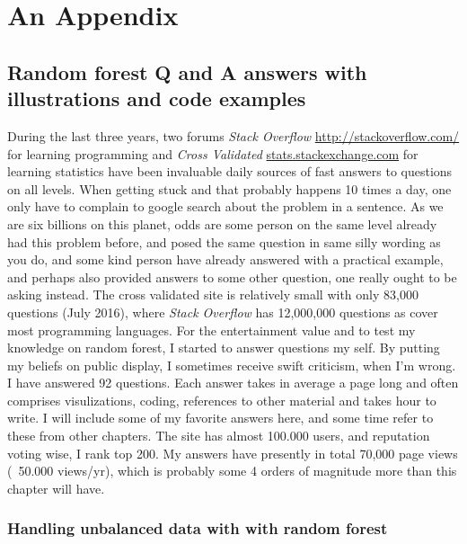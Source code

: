 \chapter{An Appendix}


\section{Random forest Q and A answers with illustrations and code examples}

During the last three years, two forums \textit{Stack Overflow} \url{http://stackoverflow.com/} for learning programming and \textit{Cross Validated} \url{stats.stackexchange.com} for learning statistics have been invaluable daily sources of fast answers to questions on all levels. When getting stuck and that probably happens 10 times a day, one only have to complain to google search about the problem in a sentence. As we are six billions on this planet, odds are some person on the same level already had this problem before, and posed the same question in same silly wording as you do, and some kind person have already answered with a practical example, and perhaps also provided answers to some other question, one really ought to be asking instead. The cross validated site is relatively small with only 83,000 questions (July 2016), where \textit{Stack Overflow} has 12,000,000 questions as cover most programming languages. For the entertainment value and to test my knowledge on random forest, I started to answer questions my self. By putting my beliefs on public display, I sometimes receive swift criticism, when I'm wrong. I have answered 92 questions. Each answer takes in average  a page long and often comprises visulizations, coding, references to other material and takes hour to write. I will include some of my favorite answers here, and some time refer to these from other chapters. The site has almost 100.000 users, and reputation voting wise, I rank top 200. My answers have presently in total 70,000 page views (~50.000 views/yr), which is probably some 4 orders of magnitude more than this chapter will have.


\subsection{Handling unbalanced data with with random forest}
\label{CV1_classwt}



